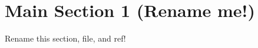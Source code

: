 \section{Main Section 1 (Rename me!)}
\label{sec:main-sec-1}

Rename this section, file, and ref!


